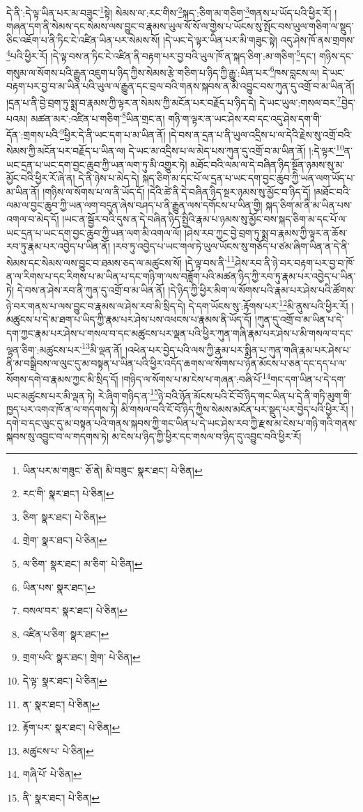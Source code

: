དེ་ནི་:དེ་ལྟ་ཡིན་པར་མ་བཟུང་\footnote{ཡིན་པར་མ་གཟུང་  ཅོ་ནེ། མི་བཟུང་  སྣར་ཐང་།  པེ་ཅིན། }སྟེ། སེམས་ལ་:རང་གིས་\footnote{རང་གི་  སྣར་ཐང་།  པེ་ཅིན། }སྐད་:ཅིག་མ་གཅིག་\footnote{ཅིག་  སྣར་ཐང་།  པེ་ཅིན། }གནས་པ་ཡོད་པའི་ཕྱིར་རོ། །གཞན་དག་ནི་སེམས་དང་སེམས་ལས་བྱུང་བ་རྣམས་ཡུལ་སོ་སོ་ལ་གྱེས་པ་ཡོངས་སུ་སྤོང་བས་ཡུལ་གཅིག་ལ་སྡུད་ཅིང་འཇོག་པ་ནི་ཏིང་ངེ་འཛིན་ཡིན་པར་སེམས་སོ། །དེ་ཡང་དེ་ལྟར་ཡིན་པར་མི་གཟུང་སྟེ། འདུ་ཤེས་ཁོ་ནས་གྲགས་\footnote{གྲེག་  སྣར་ཐང་།  པེ་ཅིན། }པའི་ཕྱིར་རོ། །དེ་ལྟ་བས་ན་ཏིང་ངེ་འཛིན་ནི་བརྟག་པར་བྱ་བའི་ཡུལ་ཁོ་ན་སྐད་ཅིག་:མ་གཅིག་\footnote{ལ་ཅིག་  སྣར་ཐང་། མ་ཅིག་  པེ་ཅིན། }དང་། གཉིས་དང་གསུམ་ལ་སོགས་པའི་རྒྱུན་འཇུག་པ་ཉིད་ཀྱིས་སེམས་རྩེ་གཅིག་པ་ཉིད་ཀྱི་རྒྱུ་:ཡིན་པར་\footnote{ཡིན་པས་  སྣར་ཐང་། }ཁས་བླངས་ལ། དེ་ཡང་བརྟག་པར་བྱ་བ་མ་ཡིན་པའི་ཡུལ་ལ་རྒྱུན་དང་བྲལ་བའི་གནས་སྐབས་ན་མི་འབྱུང་བས་ཀུན་དུ་འགྲོ་བ་མ་ཡིན་ནོ། །དྲན་པ་ནི་བྱེ་བྲག་ཏུ་སྨྲ་བ་རྣམས་ཀྱི་ལྟར་ན་སེམས་ཀྱི་མངོན་པར་བརྗོད་པ་ཉིད་དེ། དེ་ཡང་ཡུལ་:གསལ་བར་\footnote{བསལ་བར་  སྣར་ཐང་།  པེ་ཅིན། }བྱེད་པའམ། མཚན་མར་:འཛིན་པ་གཅིག་\footnote{འཛིན་པ་ཅིག་  སྣར་ཐང་། }ཡིན་གྲང་ན། གཉི་ག་ལྟར་ན་ཡང་ཤེས་རབ་དང་འདུ་ཤེས་དག་གི་དོན་:གྲགས་པའི་\footnote{གྲག་པའི་  སྣར་ཐང་། གྲེག་  པེ་ཅིན། }ཕྱིར་དེ་ནི་ཡང་དག་པ་མ་ཡིན་ནོ། །དེ་བས་ན་དྲན་པ་ནི་ཡུལ་འདྲིས་པ་ལ་དེའི་རྗེས་སུ་འགྲོ་བའི་སེམས་ཀྱི་མངོན་པར་བརྗོད་པ་ཡིན་ལ། དེ་ཡང་མ་འདྲིས་པ་ལ་མེད་པས་ཀུན་དུ་འགྲོ་བ་མ་ཡིན་ནོ། །:དེ་ལྟར་\footnote{དེ་ལྟ་  སྣར་ཐང་།  པེ་ཅིན། }ན་ཡང་དྲན་པ་ཡང་དག་བྱང་ཆུབ་ཀྱི་ཡན་ལག་ཏུ་མི་འགྱུར་ཏེ། མཐོང་བའི་ལམ་ལ་དེ་བཞིན་ཉིད་སྔོན་ཉམས་སུ་མ་མྱོང་བའི་ཕྱིར་རོ་ཞེ་ན། དེ་ནི་ཉེས་པ་མེད་དེ། སྐད་ཅིག་མ་དང་པོ་ལ་དྲན་པ་ཡང་དག་བྱང་ཆུབ་ཀྱི་ཡན་ལག་ཡོད་པ་མ་ཡིན་ནོ། །གཉིས་ལ་སོགས་པ་ལ་ནི་ཡོད་དོ། །དེའི་ཚེ་ནི་དེ་བཞིན་ཉིད་སྔར་ཉམས་སུ་མྱོང་བ་ཉིད་དོ། །མཐོང་བའི་ལམ་ལ་བྱང་ཆུབ་ཀྱི་ཡན་ལག་བདུན་ཞེས་བཤད་པ་ནི་རྒྱུན་ལས་དགོངས་པ་ཡིན་གྱི། སྐད་ཅིག་མ་ནི་མ་ཡིན་པས་འགལ་བ་མེད་དོ། །ཡང་ན་སྦྱོར་བའི་དུས་ན་དེ་བཞིན་ཉིད་སྤྱིའི་རྣམ་པ་ཉམས་སུ་མྱོང་བས་སྐད་ཅིག་མ་དང་པོ་ལ་ཡང་དྲན་པ་ཡང་དག་བྱང་ཆུབ་ཀྱི་ཡན་ལག་མི་འགལ་ལོ། །ཤེས་རབ་ཀྱང་བྱེ་བྲག་ཏུ་སྨྲ་བ་རྣམས་ཀྱི་ལྟར་ན་ཆོས་རབ་ཏུ་རྣམ་པར་འབྱེད་པ་ཡིན་ནོ། །རབ་ཏུ་འབྱེད་པ་ཡང་གལ་ཏེ་ཡུལ་ཡོངས་སུ་གཅོད་པ་ཙམ་ཞིག་ཡིན་ན་དེ་ནི་སེམས་དང་སེམས་ལས་བྱུང་བ་ཐམས་ཅད་ལ་མཚུངས་སོ། །དེ་ལྟ་བས་ནི་\footnote{ན་  སྣར་ཐང་།  པེ་ཅིན། }ཤེས་རབ་ནི་ཉེ་བར་བརྟག་པར་བྱ་བ་ཁོ་ན་ལ་རིགས་པ་དང་རིགས་པ་མ་ཡིན་པ་དང་གཉི་ག་ལས་བཟློག་པའི་མཚན་ཉིད་ཀྱི་རབ་ཏུ་རྣམ་པར་འབྱེད་པ་ཡིན་ཏེ། དེ་བས་ན་ཤེས་རབ་ནི་ཀུན་དུ་འགྲོ་བ་མ་ཡིན་ནོ། །དེ་ཉིད་ཀྱི་ཕྱིར་མིག་ལ་སོགས་པའི་རྣམ་པར་ཤེས་པའི་ཚོགས་ཉེ་བར་གནས་པ་ལས་བྱུང་བ་རྣམས་ལ་ཤེས་རབ་མི་སྲིད་དེ། དེ་དག་ཡོངས་སུ་:རྟོགས་པར་\footnote{རྟོག་པར་  སྣར་ཐང་།  པེ་ཅིན། }མི་ནུས་པའི་ཕྱིར་རོ། །མཚུངས་པ་དེ་མ་ཐག་པ་ཡིད་ཀྱི་རྣམ་པར་ཤེས་པས་འཕངས་པ་རྣམས་ནི་ཡོད་དོ། །ཀུན་དུ་འགྲོ་བ་མ་ཡིན་པ་དེ་དག་ཀྱང་རྣམ་པར་ཤེས་པ་གསལ་བ་དང་མཚུངས་པར་ལྡན་པའི་ཕྱིར་ཀུན་གཞི་རྣམ་པར་ཤེས་པ་མི་གསལ་བ་དང་ལྷན་ཅིག་:མཚུངས་པར་\footnote{མཚུངས་པ་  པེ་ཅིན། }མི་ལྡན་ནོ། །འཕེན་པར་བྱེད་པའི་ལས་ཀྱི་རྣམ་པར་སྨིན་པ་ཀུན་གཞི་རྣམ་པར་ཤེས་པ་ནི་མ་བསྒྲིབས་ལ་ལུང་དུ་མ་བསྟན་པ་ཡིན་པའི་ཕྱིར་འདོད་ཆགས་ལ་སོགས་པ་ཉོན་མོངས་པ་ཅན་དང་དད་པ་ལ་སོགས་དགེ་བ་རྣམས་ཀྱང་མི་སྲིད་དོ། །གཉིད་ལ་སོགས་པ་མ་ངེས་པ་གཞན་:བཞི་པོ་\footnote{གཞི་པོ་  པེ་ཅིན། }གང་དག་ཡིན་པ་དེ་དག་ཡང་མཚུངས་པར་མི་ལྡན་ཏེ། རེ་ཞིག་གཉིད་ན་\footnote{ནི་  སྣར་ཐང་།  པེ་ཅིན། }ཉེ་བའི་ཉོན་མོངས་པའི་ངོ་བོ་ཉིད་གང་ཡིན་པ་དེ་ནི་གཏི་མུག་གི་ཁྱད་པར་འགའ་ཁོ་ན་ལ་གདགས་ཏེ། མི་གསལ་བའི་ངོ་བོ་ཉིད་ཀྱིས་སེམས་མངོན་པར་སྡུད་པར་བྱེད་པའི་ཕྱིར་རོ། །དགེ་བ་དང་ལུང་དུ་མ་བསྟན་པའི་གནས་སྐབས་ཀྱི་གང་ཡིན་པ་དེ་ཡང་ཤེས་རབ་ཀྱི་རྫས་མ་ངེས་པ་གཉི་གའི་གནས་སྐབས་སུ་འབྱུང་བ་ལ་གདགས་ཏེ། མ་ངེས་པ་ཉིད་ཀྱི་ཕྱིར་དང་གསལ་བ་ཉིད་དུ་འབྱུང་བའི་ཕྱིར་རོ། 